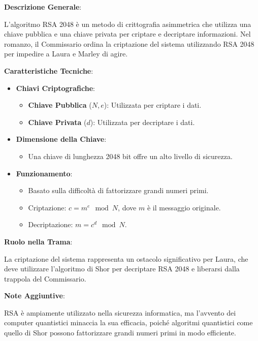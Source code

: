 \vspace{0.5cm}

\begin{tcolorbox}[colback=white,colframe=black,title=\textbf{Criptazione con Algoritmo RSA 2048}]
\begin{multicols}{2}
\textbf{Descrizione Generale}:

L'algoritmo RSA 2048 è un metodo di crittografia asimmetrica che utilizza una chiave pubblica e una chiave privata per criptare e decriptare informazioni. Nel romanzo, il Commissario ordina la criptazione del sistema utilizzando RSA 2048 per impedire a Laura e Marley di agire.

\textbf{Caratteristiche Tecniche}:

\begin{itemize}
    \item \textbf{Chiavi Criptografiche}:
    \begin{itemize}
        \item \textbf{Chiave Pubblica} (\( N, e \)): Utilizzata per criptare i dati.
        \item \textbf{Chiave Privata} (\( d \)): Utilizzata per decriptare i dati.
    \end{itemize}
    \item \textbf{Dimensione della Chiave}:
    \begin{itemize}
        \item Una chiave di lunghezza 2048 bit offre un alto livello di sicurezza.
    \end{itemize}
    \item \textbf{Funzionamento}:
    \begin{itemize}
        \item Basato sulla difficoltà di fattorizzare grandi numeri primi.
        \item Criptazione: \( c = m^e \mod N \), dove \( m \) è il messaggio originale.
        \item Decriptazione: \( m = c^d \mod N \).
    \end{itemize}
\end{itemize}

\textbf{Ruolo nella Trama}:

La criptazione del sistema rappresenta un ostacolo significativo per Laura, che deve utilizzare l'algoritmo di Shor per decriptare RSA 2048 e liberarsi dalla trappola del Commissario.

\textbf{Note Aggiuntive}:

RSA è ampiamente utilizzato nella sicurezza informatica, ma l'avvento dei computer quantistici minaccia la sua efficacia, poiché algoritmi quantistici come quello di Shor possono fattorizzare grandi numeri primi in modo efficiente.

\end{multicols}
\end{tcolorbox}

